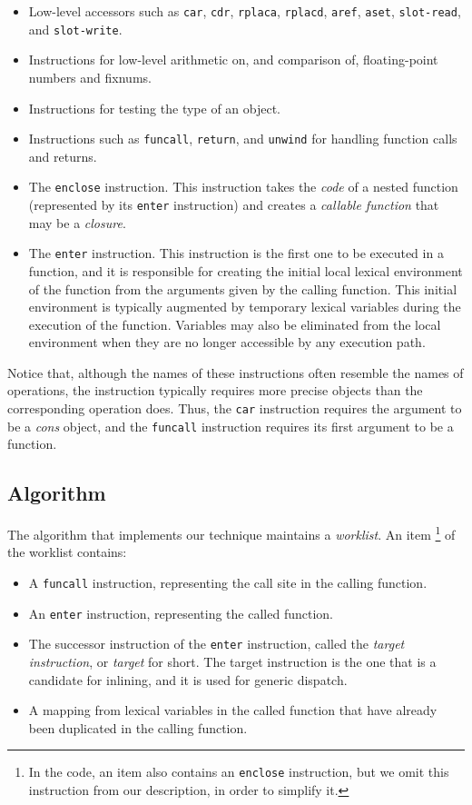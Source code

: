 \begin{itemize}
\item Low-level accessors such as \texttt{car}, \texttt{cdr},
  \texttt{rplaca}, \texttt{rplacd}, \texttt{aref}, \texttt{aset},
  \texttt{slot-read}, and \texttt{slot-write}.
\item Instructions for low-level arithmetic on, and comparison of,
  floating-point numbers and fixnums.
\item Instructions for testing the type of an object.
\item Instructions such as \texttt{funcall}, \texttt{return}, and
  \texttt{unwind} for handling function calls and returns.
\item The \texttt{enclose} instruction.  This instruction takes the
  \emph{code} of a nested function (represented by its \texttt{enter}
  instruction) and creates a \emph{callable function} that may be a
  \emph{closure}.
\item The \texttt{enter} instruction.  This instruction is the first
  one to be executed in a function, and it is responsible for creating
  the initial local lexical environment of the function from the
  arguments given by the calling function.  This initial environment
  is typically augmented by temporary lexical variables during the
  execution of the function.  Variables may also be eliminated from
  the local environment when they are no longer accessible by any
  execution path.
\end{itemize}

Notice that, although the names of these instructions often resemble
the names of \commonlisp{} operations, the instruction typically
requires more precise objects than the corresponding \commonlisp{}
operation does.  Thus, the \texttt{car} instruction requires the
argument to be a \emph{cons} object, and the \texttt{funcall}
instruction requires its first argument to be a function.

\subsection{Algorithm}

The algorithm that implements our technique maintains a
\emph{worklist}.  An item%
\footnote{In the code, an item also contains an \texttt{enclose}
  instruction, but we omit this instruction from our description, in
  order to simplify it.}
of the worklist contains:

\begin{itemize}
\item A \texttt{funcall} instruction, representing the call site in the
  calling function.
\item An \texttt{enter} instruction, representing the called function.
\item The successor instruction of the \texttt{enter} instruction,
  called the \emph{target instruction}, or \emph{target} for short.
  The target instruction is the one that is a candidate for inlining, and it
  is used for generic dispatch.
\item A mapping from lexical variables in the called function that
  have already been duplicated in the calling function.
\end{itemize}

